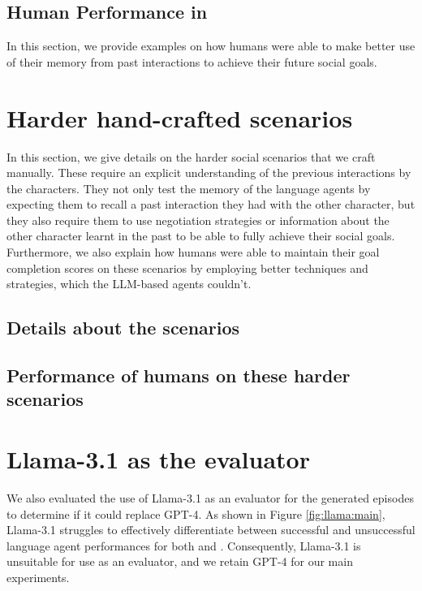 \subsection{Human Performance in \lifelongsotopia}
\label{appendix:qual:human}
In this section, we provide examples on how humans were able to make better use of their memory from past interactions to achieve their future social goals.



\clearpage


\section{Harder hand-crafted scenarios}
\label{appendix:hard_scenarios}
In this section, we give details on the harder social scenarios that we craft manually. These require an explicit understanding of the previous interactions by the characters. They not only test the memory of the language agents by expecting them to recall a past interaction they had with the other character, but they also require them to use negotiation strategies or information about the other character learnt in the past to be able to fully achieve their social goals. Furthermore, we also explain how humans were able to maintain their goal completion scores on these scenarios by employing better techniques and strategies, which the LLM-based agents couldn't.

\subsection{Details about the scenarios}
\label{appendix:hard_scenarios:details}


\clearpage

\subsection{Performance of humans on these harder scenarios}
\label{appendix:hard_scenarios:humans}


\section{Llama-3.1 as the evaluator}
\label{appendix:llama}


We also evaluated the use of Llama-3.1 as an evaluator for the generated episodes to determine if it could replace GPT-4. As shown in Figure \ref{fig:llama:main}, Llama-3.1 struggles to effectively differentiate between successful and unsuccessful language agent performances for both \believability and \goalcompletion. Consequently, Llama-3.1 is unsuitable for use as an evaluator, and we retain GPT-4 for our main experiments.



